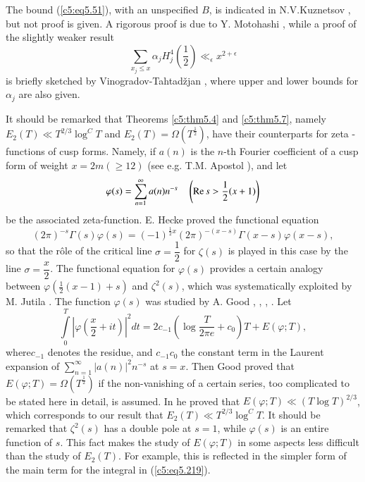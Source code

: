 The bound (\ref{c5:eq5.51}), with an unspecified $B$, is indicated in
N.V.\break Kuznetsov \cite{Kuznetsov5}, but not proof is given. A
rigorous proof is due to Y. Motohashi \cite{Motohashi7}, while a proof
of the slightly weaker result 
$$
\sum\limits_{x_j \leq x} \alpha_j H^4_j \left(\frac{1}{2} \right)
\ll_\epsilon x^{2+\epsilon} 
$$
is briefly sketched by Vinogradov-Tahtad\v zjan \cite{Vinogradov and
  Tahtadzjan2}, where upper and lower bounds for $\alpha_j$ are also
given. 

It should be remarked that Theorems \ref{c5:thm5.4} and
\ref{c5:thm5.7}, namely $E_2(T) \ll T^{2/3} \log^C T$ and $E_2 (T) =
\Omega (T^{\frac{1}{2}})$, have their counterparts for zeta -
functions 
of cusp forms. Namely, if $a(n)$ is the $n$-th Fourier coefficient of 
a cusp form of weight $x = 2m(\geq 12)$ (see e.g. T.M. Apostol
\cite{Apostol1}), and let 
$$
\varphi(s) = \sum\limits^{\infty}_{n=1} a(n) n^{-s} \quad \left(\operatorname{Re} s
> \frac{1}{2} (x+1) \right) 
$$
be the associated zeta-function. E. Hecke \cite{Hecke1} proved the
functional equation 
$$
(2\pi)^{-s} \Gamma(s) \varphi(s) = (-1)^{\frac{1}{2} x}
(2\pi)^{-(x-s)} \Gamma (x-s) \varphi (x-s), 
$$
so that the r\^ole of the critical line $\sigma =\dfrac{1}{2}$ for
$\zeta(s)$ is played in this case by the line $\sigma
=\dfrac{x}{2}$. The functional equation for $\varphi(s)$ provides a
certain analogy between $\varphi(\frac{1}{2} (x-1) +s)$ and $\zeta^2
(s)$, which was systematically exploited by M. Jutila
\cite{Jutila9}. The function $\varphi(s)$ was studied by A. Good
\cite{Good1}, \cite{Good4}, \cite{Good5}, \cite{Good6}. Let 
\begin{equation}
\int\limits^T_0 \left|\varphi \left(\frac{x}{2} + it \right)\right|^2
dt  = 2c_{-1} \left(\log \frac{T}{2\pi e} + c_0 \right) T +
E(\varphi;T), \label{c5:eq5.219} 
\end{equation}
where\pageoriginale $c_{-1}$ denotes the residue, and $c_{-1} c_0$ the
constant term in the Laurent expansion of $\sum\limits^\infty_{n=1}
|a(n)|^2 n^{-s}$ at $s=x$. Then Good \cite{Good4} proved that
$E(\varphi; T) = \Omega (T^{\frac{1}{2}})$ if the non-vanishing of a
certain series, too complicated to be stated here in detail, is
assumed. In \cite{Good5} he proved that $E(\varphi;T) \ll (T \log
T)^{2/3}$, which corresponds to our result that $E_2(T) \ll T^{2/3}
\log^C T$. It should be remarked that $\zeta^2(s)$ has a double pole
at $s=1$, while $\varphi(s)$ is an entire function of $s$. This fact
makes the study of $E(\varphi;T)$ in some aspects less difficult than
the study of $E_2(T)$. For example, this is reflected in the simpler
form of the main term for the integral in (\ref{c5:eq5.219}). 

